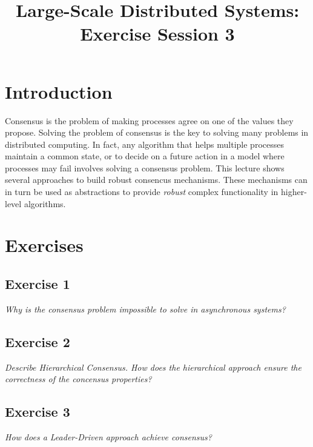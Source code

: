 

\title{Large-Scale Distributed Systems: Exercise Session 3}
\maketitle

\section{Introduction}
\label{sec:introduction}

Consensus is the problem of making processes agree on one of the values they propose. Solving the problem of consensus is the key to solving many problems in distributed computing. In fact, any algorithm that helps multiple processes maintain a common state, or to decide on a future action in a model where processes may fail involves solving a consensus problem. This lecture shows several approaches to build robust consencus mechanisms. These mechanisms can in turn be used as abstractions to provide \emph{robust} complex functionality in higher-level algorithms.

\section{Exercises}
\label{sec:exercises}

\subsection*{Exercise 1}
\label{sec:exercise_1}

\emph{Why is the consensus problem impossible to solve in asynchronous systems?}

\subsection*{Exercise 2}
\label{sec:exercise_2}

\emph{Describe Hierarchical Consensus. How does the hierarchical approach ensure the correctness of the concensus properties?}

\subsection*{Exercise 3}
\label{sec:exercise_3}

\emph{How does a Leader-Driven approach achieve consensus?}

